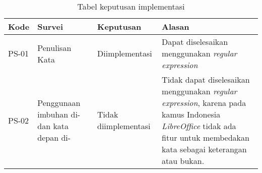 \begin{table}[H]
	\renewcommand{\arraystretch}{1.5}
	\caption {Tabel keputusan implementasi} \label{tab:keputusan1}
	\begin{center}
		\begin{tabular}{|p{1.5 cm}|>{\raggedright} p{4 cm}| p{2.5 cm}| p{6.5 cm}|}
		\hline
		Kode & Survei & Keputusan & Alasan \\ 
		\hline 
		PS-01 & Penulisan Kata & Diimplementasi & Dapat diselesaikan menggunakan \textit{regular expression} \newline \\ 
		\hline 
		PS-02 & Penggunaan imbuhan di- dan kata depan di- & Tidak \newline diimplementasi & Tidak dapat diselesaikan menggunakan \textit{regular expression}, karena pada kamus Indonesia \textit{LibreOffice} tidak ada fitur untuk membedakan kata sebagai keterangan atau bukan. \newline \\ 
		\hline 
		\end{tabular}
	\end{center}
\end{table}

